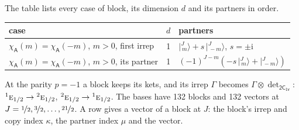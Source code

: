 \documentclass[10pt,a4paper]{article}
\numberwithin{equation}{section}
\newcommand{\grp}[1]{\mathsf{#1}}
\newcommand{\irr}[1]{\text{\normalfont\scshape #1}}
\newcommand{\conjpair}[1]{{}^{#1}}
\newcommand{\iunit}{\mathrm{i}}
\newcommand{\chiA}{\chi_{\grp{A}}}
\newcommand{\irrprod}{\otimes}
\newcommand{\mult}{\kappa}
\newcommand{\intx}{\mu}
\newcommand{\jm}[2]{\bigl\lvert{}^{#1}_{\,#2}\bigr\rangle}
\begin{document}
\leavevmode\label{n:head.case}\label{n:head.partners}The table lists every case of block, its dimension $d$ and its partners in order.
\begin{center}\begin{tabular}{@{}lrl@{}}\toprule
case & $d$ & partners\\\midrule
$\chiA(m) = \chiA(-m)$, $m > 0$, first irrep & 1 & $\jm{J}{m} + s\,\jm{J}{-m}$, $s = \pm\iunit$\\
$\chiA(m) = \chiA(-m)$, $m > 0$, its partner & 1 & $(-1)^{J-m}(-s\,\jm{J}{m} + \jm{J}{-m})$\\
\bottomrule\end{tabular}\end{center}
\leavevmode\label{n:operator.determinant.character}At the parity $p = -1$ a block keeps its kets, and its irrep $\Gamma$ becomes $\Gamma \irrprod \det_{\grp{2C_{1v}}}$: $\conjpair{1}\irr{e}_{1/2} \to \conjpair{2}\irr{e}_{1/2}$, $\conjpair{2}\irr{e}_{1/2} \to \conjpair{1}\irr{e}_{1/2}$.
The bases have 132 blocks and 132 vectors at $J = \nicefrac{1}{2}, \nicefrac{3}{2}, \dots, \nicefrac{21}{2}$. \label{n:index.copy}\label{n:head.vector}A row gives a vector of a block at $J$: the block's irrep and copy index $\mult$, the partner index $\intx$ and the vector.
\end{document}
